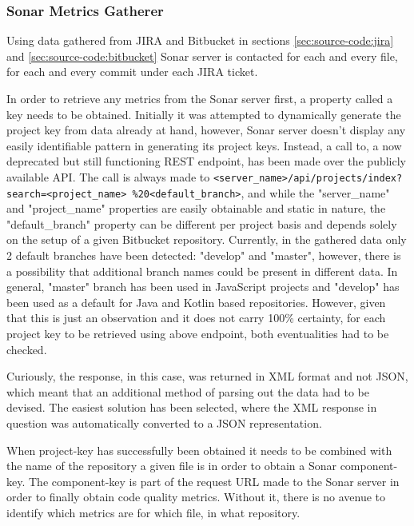 \subsubsection{Sonar Metrics Gatherer}\label{sec:source-code:sonar-metrics}
Using data gathered from JIRA and Bitbucket in sections \ref{sec:source-code:jira} and \ref{sec:source-code:bitbucket} Sonar server is contacted for each and every file, for each and every commit under each JIRA ticket. 

In order to retrieve any metrics from the Sonar server first, a property called a key needs to be obtained. Initially it was attempted to dynamically generate the project key from data already at hand, however, Sonar server doesn't display any easily identifiable pattern in generating its project keys. Instead, a call to, a now deprecated but still functioning REST endpoint, has been made over the publicly available API. 
The call is always made to \texttt{<server_name>/api/projects/index?search=<project_name> \%20<default_branch>}, and while the "server\_name" and "project\_name" properties are easily obtainable and static in nature, the "default\_branch" property can be different per project basis and depends solely on the setup of a given Bitbucket repository. Currently, in the gathered data only 2 default branches have been detected: "develop" and "master", however, there is a possibility that additional branch names could be present in different data. In general, "master" branch has been used in JavaScript projects and "develop" has been used as a default for Java and Kotlin based repositories. However, given that this is just an observation and it does not carry 100\% certainty, for each project key to be retrieved using above endpoint, both eventualities had to be checked. 

Curiously, the response, in this case, was returned in XML format and not JSON, which meant that an additional method of parsing out the data had to be devised. 
The easiest solution has been selected, where the XML response in question was automatically converted to a JSON representation. 

When project-key has successfully been obtained it needs to be combined with the name of the repository a given file is in order to obtain a Sonar component-key. The component-key is part of the request URL made to the Sonar server in order to finally obtain code quality metrics. Without it, there is no avenue to identify which metrics are for which file, in what repository.

